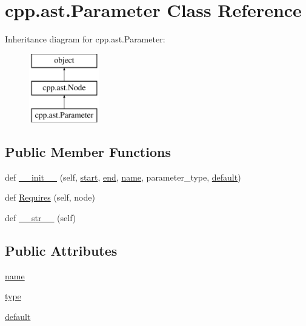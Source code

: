 \hypertarget{classcpp_1_1ast_1_1Parameter}{}\section{cpp.\+ast.\+Parameter Class Reference}
\label{classcpp_1_1ast_1_1Parameter}
Inheritance diagram for cpp.\+ast.\+Parameter\+:\begin{figure}[H]
\begin{center}
\leavevmode
\includegraphics[height=3.000000cm]{classcpp_1_1ast_1_1Parameter}
\end{center}
\end{figure}
\subsection*{Public Member Functions}
\begin{DoxyCompactItemize}
\item 
def \mbox{\hyperlink{classcpp_1_1ast_1_1Parameter_a4fe27f559d44adac9e9b5898ba76c5b3}{\+\_\+\+\_\+init\+\_\+\+\_\+}} (self, \mbox{\hyperlink{classcpp_1_1ast_1_1Node_a7b2aa97e6a049bb1a93aea48c48f1f44}{start}}, \mbox{\hyperlink{classcpp_1_1ast_1_1Node_a3c5e5246ccf619df28eca02e29d69647}{end}}, \mbox{\hyperlink{classcpp_1_1ast_1_1Parameter_aae0375fb0ded8fa9090feea6bdff2784}{name}}, parameter\+\_\+type, \mbox{\hyperlink{classcpp_1_1ast_1_1Parameter_a4ceae2ac87d82c5542c4e7385eb4c97e}{default}})
\item 
def \mbox{\hyperlink{classcpp_1_1ast_1_1Parameter_a4bc5c17a0d606d35be40cb4c2c1a67a6}{Requires}} (self, node)
\item 
def \mbox{\hyperlink{classcpp_1_1ast_1_1Parameter_aabfbabb3c744a0da4a012ceb4299947a}{\+\_\+\+\_\+str\+\_\+\+\_\+}} (self)
\end{DoxyCompactItemize}
\subsection*{Public Attributes}
\begin{DoxyCompactItemize}
\item 
\mbox{\hyperlink{classcpp_1_1ast_1_1Parameter_aae0375fb0ded8fa9090feea6bdff2784}{name}}
\item 
\mbox{\hyperlink{classcpp_1_1ast_1_1Parameter_a5eed090000c41551a10c21f175ad33e3}{type}}
\item 
\mbox{\hyperlink{classcpp_1_1ast_1_1Parameter_a4ceae2ac87d82c5542c4e7385eb4c97e}{default}}
\end{DoxyCompactItemize}


